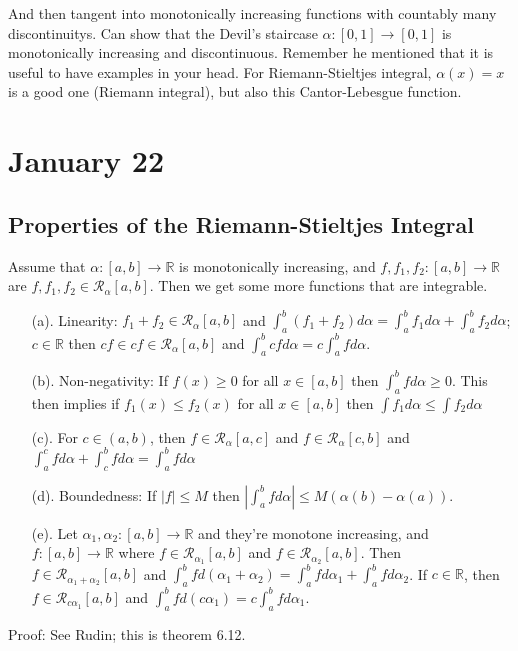 \documentclass{article}
\theoremstyle{plain}
\theoremstyle{remark}
\newcommand{\R}{{\mathbb R}}
\begin{document}
And then tangent into monotonically increasing functions with countably many discontinuitys.
Can show that the Devil's staircase $\alpha \colon [0,1] \to [0,1]$
is monotonically increasing and discontinuous.
Remember he mentioned that it is useful to have examples in your head.
For Riemann-Stieltjes integral, $\alpha(x) = x$ is a good one (Riemann integral),
but also this Cantor-Lebesgue function.

\section*{January 22}
\subsection{Properties of the Riemann-Stieltjes Integral}
Assume that $\alpha \colon [a,b] \to \R$ is monotonically increasing,
and $f,f_1,f_2 \colon [a,b] \to \R$ are $f,f_1,f_2 \in \mathcal{R}_\alpha[a,b]$.
Then we get some more functions that are integrable.
\begin{enumerate}
	\item[(a).] Linearity: $f_1 + f_2 \in \mathcal{R}_\alpha[a,b]$
		and $\int_a^b(f_1+f_2)d\alpha = \int_a^b f_1d\alpha + \int_a^bf_2d\alpha$;
		$c \in \R$ then $cf \in cf\in\mathcal{R}_\alpha[a,b]$
		and $\int_a^b cfd\alpha = c\int_a^bfd\alpha$.
	\item[(b).] Non-negativity: If $f(x) \geq 0$ for all $x \in [a,b]$
		then $\int_a^b fd\alpha \geq 0$.
		This then implies if $f_1(x) \leq f_2(x)$ for all $x \in [a,b]$
		then $\int f_1d\alpha \leq \int f_2d\alpha$
	\item[(c).] For $c \in (a,b)$, then $f \in \mathcal{R}_\alpha[a,c]$
		and $f \in \mathcal{R}_\alpha[c,b]$
		and $\int_a^c fd\alpha + \int_c^b fd\alpha = \int_a^bfd\alpha$
	\item[(d).] Boundedness: If $|f| \leq M$ then
		$\left\lvert \int_a^b fd\alpha\right\rvert \leq M(\alpha(b) - \alpha(a))$.
	\item[(e).] Let $\alpha_1,\alpha_2 \colon [a,b] \to \R$ and they're monotone increasing,
		and $f \colon [a,b] \to \R$ where $f \in \mathcal{R}_{\alpha_1}[a,b]$
		and $f \in \mathcal{R}_{\alpha_2}[a,b]$.
		Then $f \in \mathcal{R}_{\alpha_1+\alpha_2}[a,b]$
		and $\int_a^b fd(\alpha_1 + \alpha_2) = \int_a^b fd\alpha_1 +
		\int_a^b fd\alpha_2$.
		If $c \in \R$, then $f \in \mathcal{R}_{c\alpha_1}[a,b]$
		and $\int_a^b fd(c\alpha_1) = c\int_a^bfd\alpha_1$.
\end{enumerate}
Proof: See Rudin; this is theorem 6.12.
\end{document}
